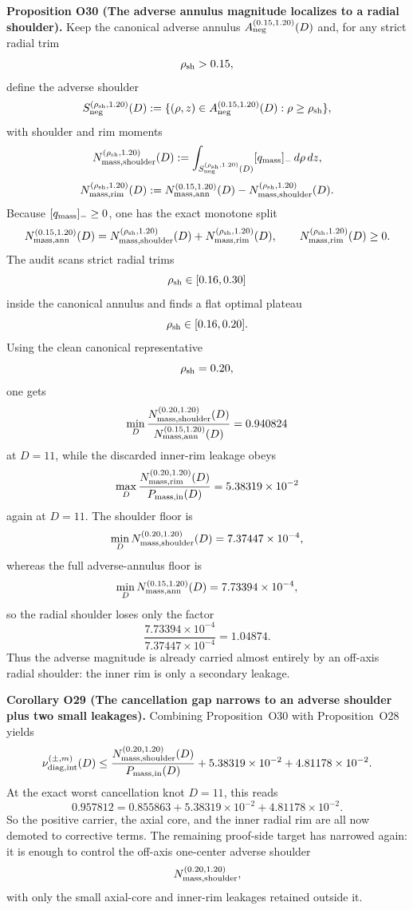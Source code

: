 \documentclass[aps,prd,onecolumn,notitlepage,nofootinbib,superscriptaddress,11pt,floatfix]{revtex4-2}
\begin{document}
\medskip\noindent\textbf{Proposition O30 (The adverse annulus magnitude localizes to a radial shoulder).}
Keep the canonical adverse annulus \(A_{\rm neg}^{(0.15,1.20)}(D)\) and, for any strict radial trim
\[
\rho_{\rm sh}>0.15,
\]
define the adverse shoulder
\[
S_{\rm neg}^{(\rho_{\rm sh},1.20)}(D)
:=
\{(\rho,z)\in A_{\rm neg}^{(0.15,1.20)}(D): \rho\ge \rho_{\rm sh}\},
\]
with shoulder and rim moments
\[
N_{\rm mass,shoulder}^{(\rho_{\rm sh},1.20)}(D)
:=
\int_{S_{\rm neg}^{(\rho_{\rm sh},1.20)}(D)} [q_{\rm mass}]_-\,d\rho\,dz,
\]
\[
N_{\rm mass,rim}^{(\rho_{\rm sh},1.20)}(D)
:=
N_{\rm mass,ann}^{(0.15,1.20)}(D)
-
N_{\rm mass,shoulder}^{(\rho_{\rm sh},1.20)}(D).
\]
Because \([q_{\rm mass}]_-\ge 0\), one has the exact monotone split
\[
N_{\rm mass,ann}^{(0.15,1.20)}(D)
=
N_{\rm mass,shoulder}^{(\rho_{\rm sh},1.20)}(D)
+
N_{\rm mass,rim}^{(\rho_{\rm sh},1.20)}(D),
\qquad
N_{\rm mass,rim}^{(\rho_{\rm sh},1.20)}(D)\ge 0.
\]
The audit
scans strict radial trims
\[
\rho_{\rm sh}\in[0.16,0.30]
\]
inside the canonical annulus and finds a flat optimal plateau
\[
\rho_{\rm sh}\in[0.16,0.20].
\]
Using the clean canonical representative
\[
\rho_{\rm sh}=0.20,
\]
one gets
\[
\min_D
\frac{N_{\rm mass,shoulder}^{(0.20,1.20)}(D)}
{N_{\rm mass,ann}^{(0.15,1.20)}(D)}
=
0.940824
\]
at \(D=11\), while the discarded inner-rim leakage obeys
\[
\max_D
\frac{N_{\rm mass,rim}^{(0.20,1.20)}(D)}
{P_{\rm mass,in}(D)}
=
5.38319\times10^{-2}
\]
again at \(D=11\). The shoulder floor is
\[
\min_D N_{\rm mass,shoulder}^{(0.20,1.20)}(D)
=
7.37447\times10^{-4},
\]
whereas the full adverse-annulus floor is
\[
\min_D N_{\rm mass,ann}^{(0.15,1.20)}(D)
=
7.73394\times10^{-4},
\]
so the radial shoulder loses only the factor
\[
\frac{7.73394\times10^{-4}}{7.37447\times10^{-4}}
=
1.04874.
\]
Thus the adverse magnitude is already carried almost entirely by an off-axis radial shoulder: the inner rim is only a secondary leakage.

\medskip\noindent\textbf{Corollary O29 (The cancellation gap narrows to an adverse shoulder plus two small leakages).}
Combining Proposition~O30 with Proposition~O28 yields
\[
\nu_{\rm diag,int}^{(\pm,m)}(D)
\le
\frac{N_{\rm mass,shoulder}^{(0.20,1.20)}(D)}
{P_{\rm mass,in}(D)}
+
5.38319\times10^{-2}
+
4.81178\times10^{-2}.
\]
At the exact worst cancellation knot \(D=11\), this reads
\[
0.957812
=
0.855863
+
5.38319\times10^{-2}
+
4.81178\times10^{-2}.
\]
So the positive carrier, the axial core, and the inner radial rim are all now demoted to corrective terms. The remaining proof-side target has narrowed again: it is enough to control the off-axis one-center adverse shoulder
\[
N_{\rm mass,shoulder}^{(0.20,1.20)},
\]
with only the small axial-core and inner-rim leakages retained outside it.
\end{document}
